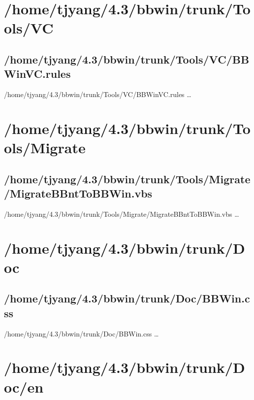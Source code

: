 \section{/home/tjyang/4.3/bbwin/trunk/Tools/VC}

\subsection{/home/tjyang/4.3/bbwin/trunk/Tools/VC/BBWinVC.rules}
\lstset{numberstyle=\tiny,numbers=left,
   breaklines=true,
   stepnumber=1,numbersep=5pt,firstnumber=1,
   xleftmargin=12pt,showstringspaces=false}
\noindent /home/tjyang/4.3/bbwin/trunk/Tools/VC/BBWinVC.rules  \ldots



\section{/home/tjyang/4.3/bbwin/trunk/Tools/Migrate}

\subsection{/home/tjyang/4.3/bbwin/trunk/Tools/Migrate/MigrateBBntToBBWin.vbs}
\lstset{numberstyle=\tiny,numbers=left,
   breaklines=true,
   stepnumber=1,numbersep=5pt,firstnumber=1,
   xleftmargin=12pt,showstringspaces=false}
\noindent /home/tjyang/4.3/bbwin/trunk/Tools/Migrate/MigrateBBntToBBWin.vbs  \ldots



\section{/home/tjyang/4.3/bbwin/trunk/Doc}



\subsection{/home/tjyang/4.3/bbwin/trunk/Doc/BBWin.css}
\lstset{numberstyle=\tiny,numbers=left,
   breaklines=true,
   stepnumber=1,numbersep=5pt,firstnumber=1,
   xleftmargin=12pt,showstringspaces=false}
\noindent /home/tjyang/4.3/bbwin/trunk/Doc/BBWin.css  \ldots



\section{/home/tjyang/4.3/bbwin/trunk/Doc/en}



